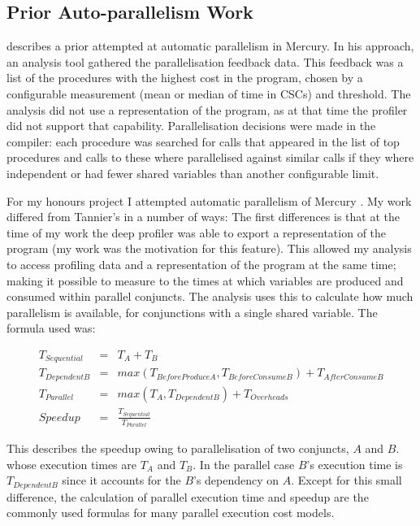 \subsection{Prior Auto-parallelism Work}

\citet{tannier:2007:parallel_mercury} describes a prior attempted at automatic
parallelism in Mercury.
In his approach, 
an analysis tool gathered the parallelisation feedback data.
This feedback was a list of the procedures with the highest cost in the program,
chosen by a configurable measurement (mean or median of time in CSCs) and threshold.
The analysis did not use a representation of the program,
as at that time the profiler did not support that capability.
Parallelisation decisions were made in the compiler:
each procedure was searched for calls that appeared in the list of top procedures
and calls to these where parallelised against similar calls if they
where independent or had fewer shared variables than another configurable limit.

For my honours project I attempted automatic parallelism of Mercury
\citep{bone:2008:hons}.
My work differed from Tannier's in a number of ways:
The first differences is that at the time of my work the deep profiler
was able to export a representation of the program
(my work was the motivation for this feature).
This allowed my analysis to access profiling data and a representation
of the program at the same time;
making it possible to measure to the times at which variables are produced
and consumed within parallel conjuncts.
The analysis uses this to calculate how much parallelism is available,
for conjunctions with a single shared variable.
The formula used was:

\begin{eqnarray*}
T_{Sequential} & = & T_A + T_B \\
T_{DependentB} & = & max(T_{BeforeProduceA}, T_{BeforeConsumeB}) +
T_{AfterConsumeB} \\
T_{Parallel} & = & max(T_A, T_{DependentB}) + T_{Overheads} \\
Speedup & = & \frac{T_{Sequential}}{T_{Parallel}}
\end{eqnarray*}

This describes the speedup owing to parallelisation of two conjuncts, $A$
and $B$.
whose execution times are $T_A$ and $T_B$.
In the parallel case $B$'s execution time is $T_{DependentB}$ since it
accounts for the $B$'s dependency on $A$.
Except for this small difference,
the calculation of parallel execution time and speedup are the commonly
used formulas for many parallel execution cost models.

